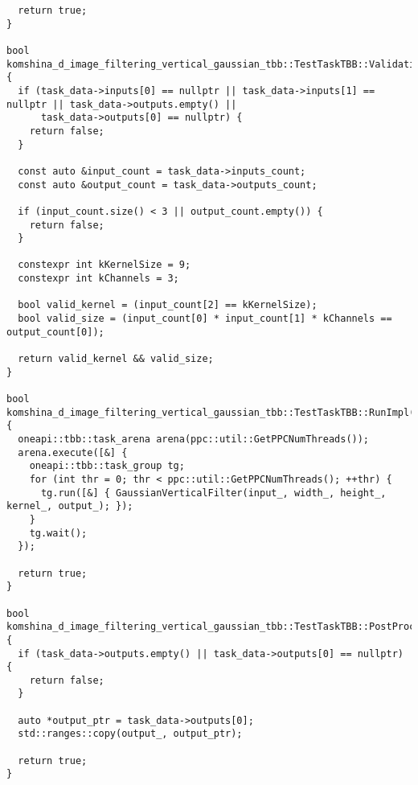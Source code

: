 \documentclass[12pt]{article}
\begin{document}
\begin{lstlisting}
  return true;
}

bool komshina_d_image_filtering_vertical_gaussian_tbb::TestTaskTBB::ValidationImpl() {
  if (task_data->inputs[0] == nullptr || task_data->inputs[1] == nullptr || task_data->outputs.empty() ||
      task_data->outputs[0] == nullptr) {
    return false;
  }

  const auto &input_count = task_data->inputs_count;
  const auto &output_count = task_data->outputs_count;

  if (input_count.size() < 3 || output_count.empty()) {
    return false;
  }

  constexpr int kKernelSize = 9;
  constexpr int kChannels = 3;

  bool valid_kernel = (input_count[2] == kKernelSize);
  bool valid_size = (input_count[0] * input_count[1] * kChannels == output_count[0]);

  return valid_kernel && valid_size;
}

bool komshina_d_image_filtering_vertical_gaussian_tbb::TestTaskTBB::RunImpl() {
  oneapi::tbb::task_arena arena(ppc::util::GetPPCNumThreads());
  arena.execute([&] {
    oneapi::tbb::task_group tg;
    for (int thr = 0; thr < ppc::util::GetPPCNumThreads(); ++thr) {
      tg.run([&] { GaussianVerticalFilter(input_, width_, height_, kernel_, output_); });
    }
    tg.wait();
  });

  return true;
}

bool komshina_d_image_filtering_vertical_gaussian_tbb::TestTaskTBB::PostProcessingImpl() {
  if (task_data->outputs.empty() || task_data->outputs[0] == nullptr) {
    return false;
  }

  auto *output_ptr = task_data->outputs[0];
  std::ranges::copy(output_, output_ptr);

  return true;
}

\end{lstlisting}
\end{document}

